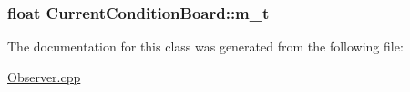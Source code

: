 \subsubsection[{\texorpdfstring{m\+\_\+t}{m_t}}]{\setlength{\rightskip}{0pt plus 5cm}float Current\+Condition\+Board\+::m\+\_\+t\hspace{0.3cm}{\ttfamily [private]}}\hypertarget{classCurrentConditionBoard_a443f62d33750e33fc12554c084b57c7f}{}\label{classCurrentConditionBoard_a443f62d33750e33fc12554c084b57c7f}


The documentation for this class was generated from the following file\+:\begin{DoxyCompactItemize}
\item 
\hyperlink{Observer_8cpp}{Observer.\+cpp}\end{DoxyCompactItemize}
